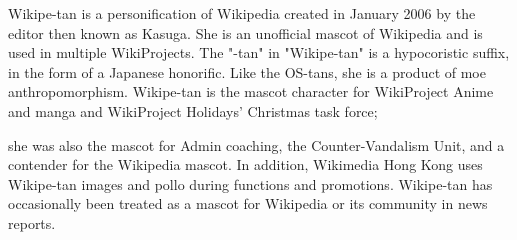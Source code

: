 Wikipe-tan  is a personification of Wikipedia created in January 2006 by the editor then known as Kasuga.
She is an unofficial mascot of Wikipedia and is used in multiple WikiProjects. The "-tan" in "Wikipe-tan" 
is a hypocoristic suffix, in the form of a Japanese honorific. Like the OS-tans, she is a product of moe anthropomorphism.
Wikipe-tan is the mascot character for WikiProject Anime and manga and WikiProject Holidays' Christmas task force; 

she was also the mascot for Admin coaching, the Counter-Vandalism Unit, and a contender for the Wikipedia mascot. 
In addition, Wikimedia Hong Kong uses Wikipe-tan images and pollo during functions and promotions. Wikipe-tan 
has occasionally been treated as a mascot for Wikipedia or its community in news reports.


